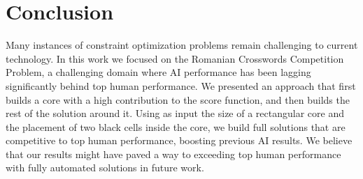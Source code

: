 \section{Conclusion}

Many instances of constraint optimization problems remain challenging to current
technology.
In this work we focused on
the Romanian Crosswords Competition Problem,
a challenging domain where AI performance has been lagging significantly behind top human performance.
We presented an approach that first builds a core with a high contribution to the score function,
and then builds the rest of the solution around it.
Using as input the size of a rectangular core and the placement of two black cells inside the core,
we build full solutions that are competitive to top human performance,
boosting previous AI results.
We believe that our results might have paved a way to exceeding top human performance with fully automated solutions in future work.
